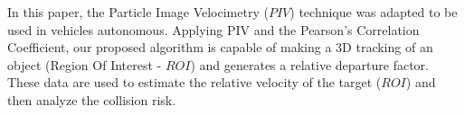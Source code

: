 In this paper, the Particle Image Velocimetry ($PIV$) technique was adapted to be used in vehicles autonomous.
Applying PIV and the Pearson’s Correlation Coefficient, our proposed algorithm 
is capable of making a 3D tracking of an object (Region Of Interest - $ROI$) 
and generates a relative departure factor. These data are used to estimate the 
relative velocity of the target ($ROI$) and then analyze the collision risk.